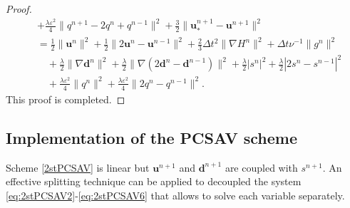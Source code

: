 \documentclass[12pt,reqno]{amsart}
\numberwithin{equation}{section}
\newcommand{\uu}{\mathrm{\textbf{u}}}
\newcommand{\dd}{\mathrm{\textbf{d}}}
\begin{document}
\begin{proof}
\begin{align}
&+\frac{\lambda\varepsilon^2}{4}\|q^{n+1}-2q^n+q^{n-1}\|^2+\frac{3}{2}\|\uu_*^{n+1}-\uu^{n+1}\|^2\nonumber\\
&=\frac{1}{2}\|\uu^{n}\|^2+\frac{1}{2}\|2\uu^{n}-\uu^{n-1}\|^2+\frac{2}{3}\Delta t^2\|\nabla H^{n}\|^2+\Delta t\nu^{-1}\|g^{n}\|^2\nonumber\\
&\quad+\frac{\lambda}{2}\lVert\nabla\dd^{n}\rVert^2
+\frac{\lambda}{2}\lVert\nabla\left(2\dd^{n}-\dd^{n-1}\right)\rVert^2+\frac{\lambda}{2}|s^{n}|^2+\frac{\lambda}{2}|2s^{n}-s^{n-1}|^2\nonumber\\
&\quad+\frac{\lambda\varepsilon^2}{4}\|q^{n}\|^2+\frac{\lambda\varepsilon^2}{4}\|2q^{n}-q^{n-1}\|^2.
\end{align}
\fi
This proof is completed.
\end{proof}

\subsection{Implementation of the PCSAV scheme} \label{sec:PCSAV.1}
Scheme \ref{2stPCSAV} is linear but $\uu^{n+1}$ and $\dd^{n+1}$ are coupled with $s^{n+1}$. An effective splitting technique \cite{56Shen} can be applied to decoupled the system \eqref{eq:2stPCSAV2}-\eqref{eq:2stPCSAV6} that allows to solve each variable separately. 
\end{document}
